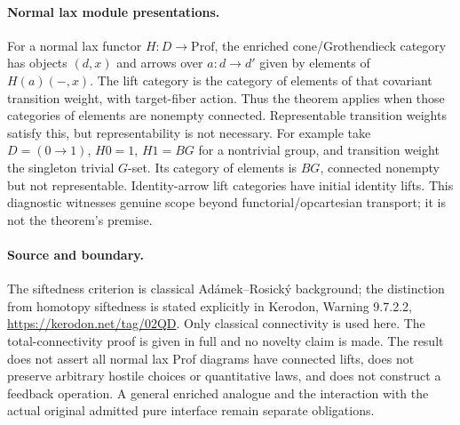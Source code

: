 \documentclass{article}
\begin{document}
\paragraph{Normal lax module presentations.} For a normal lax functor $H:D\to\mathrm{Prof}$, the enriched cone/Grothendieck category has objects $(d,x)$ and arrows over $a:d\to d'$ given by elements of $H(a)(-,x)$. The lift category is the category of elements of that covariant transition weight, with target-fiber action. Thus the theorem applies when those categories of elements are nonempty connected. Representable transition weights satisfy this, but representability is not necessary. For example take $D=(0\to1)$, $H0=1$, $H1=BG$ for a nontrivial group, and transition weight the singleton trivial $G$-set. Its category of elements is $BG$, connected nonempty but not representable. Identity-arrow lift categories have initial identity lifts. This diagnostic witnesses genuine scope beyond functorial/opcartesian transport; it is not the theorem's premise.

\paragraph{Source and boundary.} The siftedness criterion is classical Ad\'amek--Rosick\'y background; the distinction from homotopy siftedness is stated explicitly in Kerodon, Warning 9.7.2.2, \url{https://kerodon.net/tag/02QD}. Only classical connectivity is used here. The total-connectivity proof is given in full and no novelty claim is made. The result does not assert all normal lax Prof diagrams have connected lifts, does not preserve arbitrary hostile choices or quantitative laws, and does not construct a feedback operation. A general enriched analogue and the interaction with the actual original admitted pure interface remain separate obligations.
\end{document}
